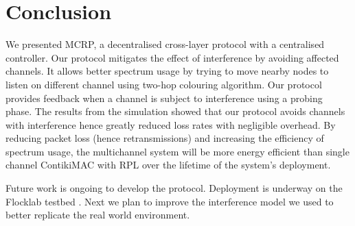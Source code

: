 \section{Conclusion}
\label{sec:conclusion}
We presented MCRP, a decentralised cross-layer protocol with a centralised controller. Our protocol mitigates the effect of interference by avoiding affected channels. It allows better spectrum usage by trying to move nearby nodes to listen on different channel using two-hop colouring algorithm. Our protocol provides feedback when a channel is subject to interference using a probing phase.
The results from the simulation showed that our protocol avoids channels with interference hence greatly reduced loss rates with negligible overhead. By reducing packet loss (hence retransmissions) and increasing the efficiency of spectrum usage, the multichannel system will be more energy efficient than single channel ContikiMAC with RPL over the lifetime of the system's deployment.

Future work is ongoing to develop the protocol. Deployment is underway on the Flocklab testbed \cite{flocklab}. Next we plan to improve the interference model we used to better replicate the real world environment. 

